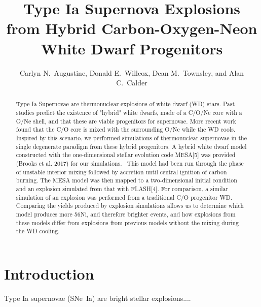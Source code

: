 \documentclass[iop,apj]{emulateapj}
\newcommand{\SNeIa}{SNe~Ia}
\begin{document}
\title{Type Ia Supernova Explosions from Hybrid Carbon-Oxygen-Neon White Dwarf Progenitors}

\author{
Carlyn N.\ Augustine,
Donald E.\ Willcox,
Dean M.\ Townsley,
and Alan C.\ Calder
}


\begin{abstract}
Type Ia Supernovae are thermonuclear explosions of white dwarf (WD) stars.
Past studies predict the existence of "hybrid" white dwarfs, made of a C/O/Ne
core with a O/Ne shell, and that these are viable progenitors for supernovae.
More recent work found that the C/O core is mixed with the surrounding O/Ne
while the WD cools. Inspired by this scenario, we performed simulations of
thermonuclear supernovae in the single degenerate paradigm from these hybrid
progenitors. A hybrid white dwarf model constructed with the one-dimensional
stellar evolution code MESA[5] was provided (Brooks et al. 2017) for our
simulations.  This model had been run through the phase of unstable interior
mixing followed by accretion until central ignition of carbon burning. The
MESA model was then mapped to a two-dimensional initial condition and an
explosion simulated from that with FLASH[4]. For comparison, a similar
simulation of an explosion was performed from a traditional C/O progenitor
WD. Comparing the yields produced by explosion simulations allows us to
determine which model produces more 56Ni, and therefore brighter events, and
how explosions from these models differ from explosions from previous models
without the mixing during the WD cooling.
\end{abstract}


\section{Introduction}
\label{sec:intro}
Type Ia supernovae (\SNeIa) are bright stellar explosions....
\end{document}
